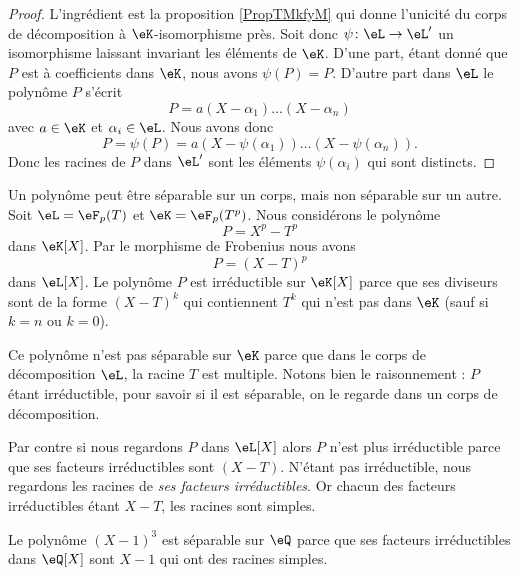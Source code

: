 \begin{proof}
    L'ingrédient est la proposition \ref{PropTMkfyM} qui donne l'unicité du corps de décomposition à \( \eK\)-isomorphisme près. Soit donc \( \psi\colon \eL\to \eL'\) un isomorphisme laissant invariant les éléments de \( \eK\). D'une part, étant donné que \( P\) est à coefficients dans \( \eK\), nous avons \( \psi(P)=P\). D'autre part dans \( \eL\) le polynôme \( P\) s'écrit
    \begin{equation}
        P=a(X-\alpha_1)\ldots (X-\alpha_n)
    \end{equation}
    avec \( a\in \eK\) et \( \alpha_i\in \eL\). Nous avons donc
    \begin{equation}
        P=\psi(P)=a(X-\psi(\alpha_1))\ldots (X-\psi(\alpha_n)).
    \end{equation}
    Donc les racines de \( P\) dans \( \eL'\) sont les éléments \( \psi(\alpha_i)\) qui sont distincts.
\end{proof}

\begin{example}
    Un polynôme peut être séparable sur un corps, mais non séparable sur un autre. Soit \( \eL=\eF_p(T)\) et \( \eK=\eF_p(T^p)\). Nous considérons le polynôme
    \begin{equation}
        P=X^p-T^p
    \end{equation}
    dans \( \eK[X]\). Par le morphisme de Frobenius nous avons 
    \begin{equation}
        P=(X-T)^p
    \end{equation}
    dans \( \eL[X]\). Le polynôme \( P\) est irréductible sur \( \eK[X]\) parce que ses diviseurs sont de la forme \( (X-T)^k\) qui contiennent \( T^k\) qui n'est pas dans \( \eK\) (sauf si \( k=n\) ou \( k=0\)).

    Ce polynôme n'est pas séparable sur \( \eK\) parce que dans le corps de décomposition \( \eL\), la racine \( T\) est multiple. Notons bien le raisonnement : \( P\) étant irréductible, pour savoir si il est séparable, on le regarde dans un corps de décomposition.

    Par contre si nous regardons \( P\) dans \( \eL[X]\) alors \( P\) n'est plus irréductible parce que ses facteurs irréductibles sont \( (X-T)\). N'étant pas irréductible, nous regardons les racines de \emph{ses facteurs irréductibles}. Or chacun des facteurs irréductibles étant \( X-T\), les racines sont simples.
\end{example}

\begin{example}
    Le polynôme \( (X-1)^3\) est séparable sur \( \eQ\) parce que ses facteurs irréductibles dans \( \eQ[X]\) sont \( X-1\) qui ont des racines simples.
\end{example}


